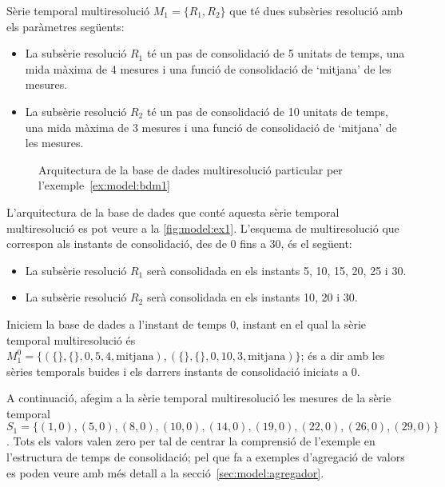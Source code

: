 \begin{example} 
\label{ex:model:bdm1}%


Sèrie temporal multiresolució $M_1=\{R_1,R_2\}$ que té dues subsèries
resolució amb els paràmetres següents:
\begin{itemize}
\item La subsèrie resolució $R_1$ té un pas de consolidació de 5
  unitats de temps, una mida màxima de 4 mesures i una funció de
  consolidació de `mitjana' de les mesures.
\item La subsèrie resolució $R_2$ té un pas de consolidació de 10
  unitats de temps, una mida màxima de 3 mesures i una funció de
  consolidació de `mitjana' de les mesures.
\end{itemize}

\begin{figure}[tp]
\centering

\caption{Arquitectura de la base de dades multiresolució particular
  per l'exemple~\ref{ex:model:bdm1}}
\label{fig:model:ex1}
\end{figure}

L'arquitectura de la base de dades que conté aquesta sèrie temporal
multiresolució es pot veure a la \autoref{fig:model:ex1}. 
 L'esquema
de multiresolució que correspon als instants de consolidació, des de 0
fins a 30, és el següent:
\begin{itemize}
\item La subsèrie resolució $R_1$ serà consolidada en els instants 5,
  10, 15, 20, 25 i 30.
\item La subsèrie resolució $R_2$ serà consolidada en els instants 10,
  20 i 30.
\end{itemize}


Iniciem la base de dades a l'instant de temps 0, instant en el qual la
sèrie temporal multiresolució és $M_1^0 = \{ ( \{\} , \{\} , 0 , 5 ,4
, \text{mitjana} ) , ( \{\} , \{\} , 0 , 10 ,3 , \text{mitjana} ) \}$;
és a dir amb les sèries temporals buides i els darrers instants de
consolidació iniciats a 0.




A continuació, afegim a la sèrie temporal multiresolució les mesures
de la sèrie temporal $S_1=\{
(1,0),(5,0),(8,0),(10,0),(14,0),(19,0),(22,0),(26,0),(29,0) \}$. Tots
els valors valen zero per tal de centrar la comprensió de l'exemple en
l'estructura de temps de consolidació; pel que fa a exemples
d'agregació de valors es poden veure amb més detall a la
secció~\ref{sec:model:agregador}.



\end{example}
